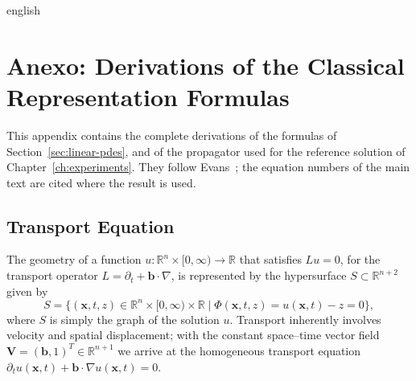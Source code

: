 \documentclass[0000.tex]{subfiles}
\begin{document}

\begin{hyphenrules}{english}

\chapter{Anexo: Derivations of the Classical Representation Formulas}\label{app:classical}

This appendix contains the complete derivations of the formulas of Section~\ref{sec:linear-pdes}, and of
the propagator used for the reference solution of Chapter~\ref{ch:experiments}. They follow
Evans~\cite{evans2010}; the equation numbers of the main text are cited where the result is used.

\section{Transport Equation}\label{app-sec:transport}

The geometry of a function $u:\mathbb{R}^n\times[0,\infty)\to\mathbb{R}$ that satisfies $Lu=0$, for the transport
operator $L=\partial_t+\mathbf{b}\cdot\nabla$, is represented by the hypersurface $S\subset\mathbb{R}^{n+2}$ given by
\begin{equation}
  S=\{(\mathbf{x},t,z)\in\mathbb{R}^n\times[0,\infty)\times\mathbb{R} \mid \Phi(\mathbf{x},t,z)=u(\mathbf{x},t)-z=0\},
  \label{eq:transport-graph}
\end{equation}
where $S$ is simply the graph of the solution $u$. Transport inherently involves velocity and spatial
displacement; with the constant space--time vector field $\mathbf{V}=(\mathbf{b},1)^{T}\in\mathbb{R}^{n+1}$ we arrive at
the homogeneous transport equation $\partial_t u(\mathbf{x},t)+\mathbf{b}\cdot\nabla u(\mathbf{x},t)=0$.


\end{hyphenrules}
\end{document}
